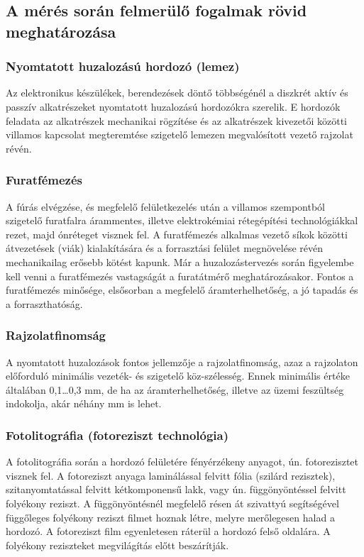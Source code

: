 \documentclass[12pt]{article}
\begin{document}
		\subsection{A mérés során felmerülő fogalmak rövid meghatározása}

		\subsubsection{Nyomtatott huzalozású hordozó (lemez)} Az elektronikus készülékek, berendezések döntő többségénél a diszkrét aktív és passzív alkatrészeket nyomtatott huzalozású hordozókra szerelik. E hordozók feladata az alkatrészek mechanikai rögzítése és az alkatrészek kivezetői közötti villamos kapcsolat megteremtése szigetelő lemezen megvalósított vezető rajzolat révén.

		\subsubsection{Furatfémezés} A fúrás elvégzése, és megfelelő felületkezelés után a villamos szempontból szigetelő furatfalra árammentes, illetve elektrokémiai rétegépítési technológiákkal rezet, majd ónréteget visznek fel. A furatfémezés alkalmas vezető síkok közötti átvezetések (viák) kialakítására és a forrasztási felület megnövelése révén mechanikailag erősebb kötést kapunk. Már a huzalozástervezés során figyelembe kell venni a furatfémezés vastagságát a furatátmérő meghatározásakor. Fontos a furatfémezés minősége, elsősorban a megfelelő áramterhelhetőség, a jó tapadás és a forraszthatóság.

		\subsubsection{Rajzolatfinomság} A nyomtatott huzalozások fontos jellemzője a rajzolatfinomság, azaz a rajzolaton előforduló minimális vezeték- és szigetelő köz-szélesség. Ennek minimális értéke általában 0,1…0,3 mm, de ha az áramterhelhetőség, illetve az üzemi feszültség indokolja, akár néhány mm is lehet.

		\subsubsection{Fotolitográfia (fotoreziszt technológia)} A fotolitográfia során a hordozó felületére fényérzékeny anyagot, ún. fotorezisztet visznek fel. A fotoreziszt anyaga laminálással felvitt fólia (szilárd rezisztek), szitanyomtatással felvitt kétkomponensű lakk, vagy ún. függönyöntéssel felvitt folyékony reziszt. A függönyöntésnél megfelelő résen át szivattyú segítségével függőleges folyékony reziszt filmet hoznak létre, melyre merőlegesen halad a hordozó. A fotoreziszt film egyenletesen ráterül a hordozó felső oldalára. A folyékony reziszteket megvilágítás előtt beszárítják.
\end{document}
